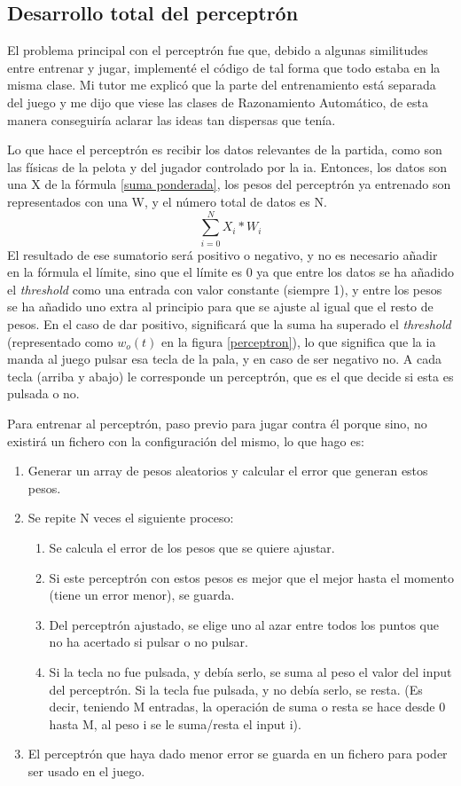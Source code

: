 \subsection{Desarrollo total del perceptrón}
El problema principal con el perceptrón fue que, debido a algunas similitudes entre entrenar y jugar, implementé el código de tal forma que todo estaba en la misma clase. Mi tutor me explicó que la parte del entrenamiento está separada del juego y me dijo que viese las clases de Razonamiento Automático, de esta manera conseguiría aclarar las ideas tan dispersas que tenía.

Lo que hace el perceptrón es recibir los datos relevantes de la partida, como son las físicas de la pelota y del jugador controlado por la \gls{ia}. Entonces, los datos son una X de la fórmula \ref{suma ponderada}, los pesos del perceptrón ya entrenado son representados con una W, y el número total de datos es N.
\begin{equation}
	\sum_{i=0}^NX_{i}*W_{i}
	\label{suma ponderada}
\end{equation}
El resultado de ese sumatorio será positivo o negativo, y no es necesario añadir en la fórmula el límite, sino que el límite es 0 ya que entre los datos se ha añadido el \textit{threshold} como una entrada con valor constante (siempre 1), y entre los pesos se ha añadido uno extra al principio para que se ajuste al igual que el resto de pesos. En el caso de dar positivo, significará que la suma ha superado el \textit{threshold} (representado como $w_o(t)$ en la figura \ref{perceptron}), lo que significa que la \gls{ia} manda al juego pulsar esa tecla de la pala, y en caso de ser negativo no. A cada tecla (arriba y abajo) le corresponde un perceptrón, que es el que decide si esta es pulsada o no.

Para entrenar al perceptrón, paso previo para jugar contra él porque sino, no existirá un fichero con la configuración del mismo, lo que hago es:
\begin{enumerate}
	\item Generar un array de pesos aleatorios y calcular el error que generan estos pesos.
	\item Se repite N veces el siguiente proceso:
	\begin{enumerate}
		\item Se calcula el error de los pesos que se quiere ajustar.
		\item Si este perceptrón con estos pesos es mejor que el mejor hasta el momento (tiene un error menor), se guarda.
		\item Del perceptrón ajustado, se elige uno al azar entre todos los puntos que no ha acertado si pulsar o no pulsar. 
		\item Si la tecla no fue pulsada, y debía serlo, se suma al peso el valor del input del perceptrón. Si la tecla fue pulsada, y no debía serlo, se resta. (Es decir, teniendo M entradas, la operación de suma o resta se hace desde 0 hasta M, al peso i se le suma/resta el input i).
	\end{enumerate}
	\item El perceptrón que haya dado menor error se guarda en un fichero para poder ser usado en el juego.
\end{enumerate}

